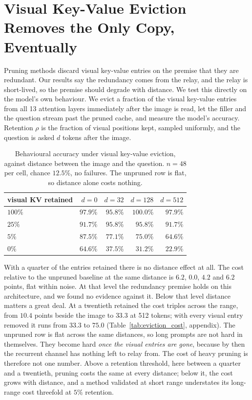 \documentclass{article}
\begin{document}
\section{Visual Key-Value Eviction Removes the Only Copy, Eventually}
\label{sec:eviction}

Pruning methods discard visual key-value entries on the premise that they are
redundant. Our results say the redundancy comes from the relay, and the relay
is short-lived, so the premise should degrade with distance. We test this
directly on the model's own behaviour. We evict a fraction of the visual
key-value entries from all 13 attention layers immediately after the image is
read, let the filler and the question stream past the pruned cache, and
measure the model's accuracy. Retention $\rho$ is the fraction of visual
positions kept, sampled uniformly, and the question is asked $d$ tokens after
the image.

\begin{table}[t]
\centering\small
\begin{tabular}{lrrrr}
\toprule
visual KV retained & $d{=}0$ & $d{=}32$ & $d{=}128$ & $d{=}512$ \\
\midrule
$100\%$ & $97.9\%$ & $95.8\%$ & $100.0\%$ & $97.9\%$ \\
$25\%$  & $91.7\%$ & $95.8\%$ & $95.8\%$  & $91.7\%$ \\
$5\%$   & $87.5\%$ & $77.1\%$ & $75.0\%$  & $64.6\%$ \\
$0\%$   & $64.6\%$ & $37.5\%$ & $31.2\%$  & $22.9\%$ \\
\bottomrule
\end{tabular}
\caption{Behavioural accuracy under visual key-value eviction, against distance
between the image and the question. $n = 48$ per cell, chance $12.5\%$, no
failures. The unpruned row is flat, so distance alone costs nothing.}
\label{tab:eviction}
\end{table}

With a quarter of the entries retained there is no distance effect at all. The
cost relative to the unpruned baseline at the same distance is $6.2$, $0.0$,
$4.2$ and $6.2$ points, flat within noise. At that level the redundancy
premise holds on this architecture, and we found no evidence against it. Below
that level distance matters a great deal. At a twentieth retained the cost
triples across the range, from $10.4$ points beside the image to $33.3$ at 512
tokens; with every visual entry removed it runs from $33.3$ to $75.0$
(Table~\ref{tab:eviction_cost}, appendix). The unpruned row is flat across the
same distances, so long prompts are not hard in themselves. They become hard
\emph{once the visual entries are gone}, because by then the recurrent channel
has nothing left to relay from. The cost of heavy pruning is therefore not
one number. Above a retention threshold, here between a quarter and a
twentieth, pruning costs the same at every distance; below it, the cost grows
with distance, and a method validated at short range understates its
long-range cost threefold at $5\%$ retention.
\end{document}
